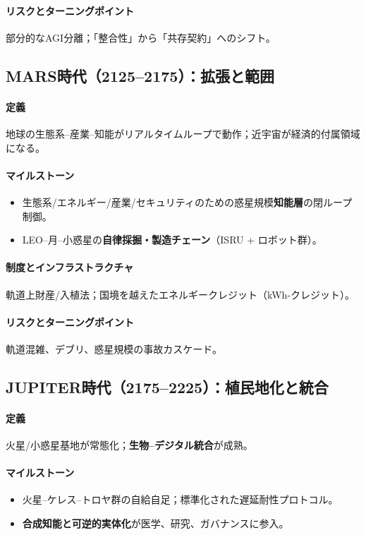 \documentclass[11pt]{article}
\begin{document}
\paragraph{リスクとターニングポイント} 部分的なAGI分離；「整合性」から「共存契約」へのシフト。

\subsection{MARS時代（2125–2175）：拡張と範囲}
\paragraph{定義} 地球の生態系–産業–知能がリアルタイムループで動作；近宇宙が経済的付属領域になる。

\paragraph{マイルストーン}
\begin{itemize}[noitemsep]
  \item 生態系/エネルギー/産業/セキュリティのための惑星規模\textbf{知能層}の閉ループ制御。
  \item LEO–月–小惑星の\textbf{自律採掘・製造チェーン}（ISRU + ロボット群）。
\end{itemize}

\paragraph{制度とインフラストラクチャ} 軌道上財産/入植法；国境を越えたエネルギークレジット（kWh-クレジット）。

\paragraph{リスクとターニングポイント} 軌道混雑、デブリ、惑星規模の事故カスケード。

\subsection{JUPITER時代（2175–2225）：植民地化と統合}
\paragraph{定義} 火星/小惑星基地が常態化；\textbf{生物–デジタル統合}が成熟。

\paragraph{マイルストーン}
\begin{itemize}[noitemsep]
  \item 火星–ケレス–トロヤ群の自給自足；標準化された遅延耐性プロトコル。
  \item \textbf{合成知能と可逆的実体化}が医学、研究、ガバナンスに参入。
\end{itemize}
\end{document}
